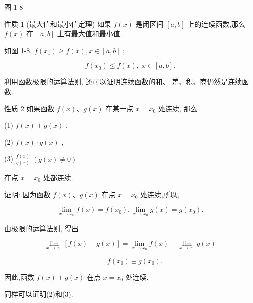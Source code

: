\documentclass[lang=cn,newtx,10pt,scheme=chinese]{elegantbook}
\begin{document}
图 1-8

性质 1 (最大值和最小值定理) 如果 \(f\left( x\right)\) 是闭区间 \(\left\lbrack {a,b}\right\rbrack\) 上的连续函数,那么 \(f\left( x\right)\) 在 \(\left\lbrack {a,b}\right\rbrack\) 上有最大值和最小值.

如图 1-8, \(f\left( {x}_{1}\right) \geq f\left( x\right) ,x \in \left\lbrack {a,b}\right\rbrack\) ;

\[
f\left( {x}_{0}\right) \leq f\left( x\right) ,\;x \in \left\lbrack {a,b}\right\rbrack .
\]

利用函数极限的运算法则, 还可以证明连续函数的和、 差、积、商仍然是连续函数.

性质 2 如果函数 \(f\left( x\right) \text{、}g\left( x\right)\) 在某一点 \(x = {x}_{0}\) 处连续, 那么

(1) \(f\left( x\right) \pm g\left( x\right)\) ,

(2) \(f\left( x\right) \cdot g\left( x\right)\) ,

(3) \(\frac{f\left( x\right) }{g\left( x\right) }\;\left( {g\left( x\right) \neq 0}\right)\)

在点 \(x = {x}_{0}\) 处都连续.

证明: 因为函数 \(f\left( x\right) \text{、}g\left( x\right)\) 在点 \(x = {x}_{0}\) 处连续,所以,

\[
\mathop{\lim }\limits_{{x \rightarrow {x}_{0}}}f\left( x\right) = f\left( {x}_{0}\right) ,\mathop{\lim }\limits_{{x \rightarrow {x}_{0}}}g\left( x\right) = g\left( {x}_{0}\right) .
\]

由极限的运算法则, 得出

\[
\mathop{\lim }\limits_{{x \rightarrow {x}_{0}}}\left\lbrack {f\left( x\right) \pm g\left( x\right) }\right\rbrack = \mathop{\lim }\limits_{{x \rightarrow {x}_{0}}}f\left( x\right) \pm \mathop{\lim }\limits_{{x \rightarrow {x}_{0}}}g\left( x\right)
\]

\[
= f\left( {x}_{0}\right) \pm g\left( {x}_{0}\right) \text{.}
\]

因此,函数 \(f\left( x\right) \pm g\left( x\right)\) 在点 \(x = {x}_{0}\) 处连续.

同样可以证明(2)和(3).
\end{document}
